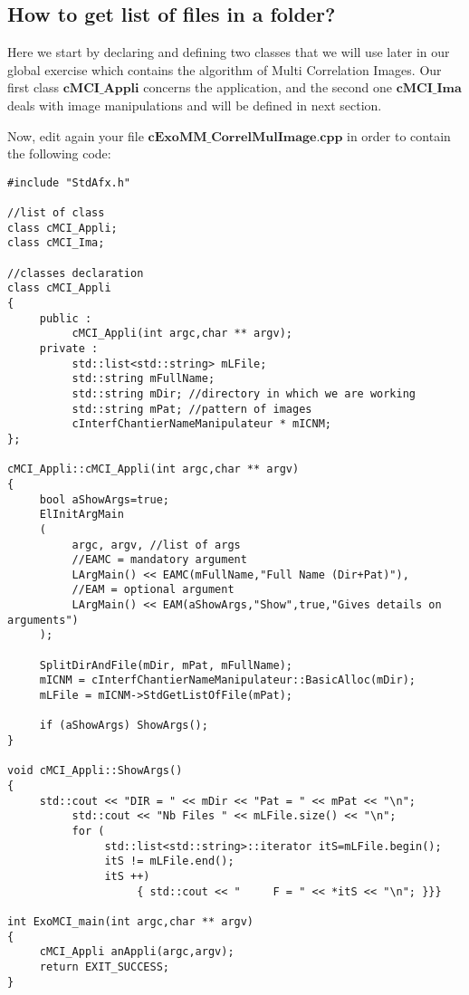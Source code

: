 \documentclass[a4paper]{book}
\begin{document}
\subsection{How to get list of files in a folder?}
Here we start by declaring and defining two classes that we will use later in our global exercise which contains the algorithm of Multi Correlation Images. Our first class $\textbf{cMCI\_Appli}$ concerns the application, and the second one $\textbf{cMCI\_Ima}$ deals with image manipulations and will be defined in next section. \newline

Now, edit again your file $\textbf{cExoMM\_CorrelMulImage.cpp}$ in order to contain the following code:

\begin{lstlisting}
#include "StdAfx.h" 

//list of class 
class cMCI_Appli; 
class cMCI_Ima; 

//classes declaration 
class cMCI_Appli 
{ 
     public : 
          cMCI_Appli(int argc,char ** argv); 
     private : 
          std::list<std::string> mLFile; 
          std::string mFullName; 
          std::string mDir; //directory in which we are working 
          std::string mPat; //pattern of images 
          cInterfChantierNameManipulateur * mICNM; 
}; 

cMCI_Appli::cMCI_Appli(int argc,char ** argv) 
{ 
     bool aShowArgs=true; 
     ElInitArgMain 
     ( 
          argc, argv, //list of args
          //EAMC = mandatory argument 
          LArgMain() << EAMC(mFullName,"Full Name (Dir+Pat)"),
          //EAM = optional argument 
          LArgMain() << EAM(aShowArgs,"Show",true,"Gives details on arguments")
     ); 

     SplitDirAndFile(mDir, mPat, mFullName); 
     mICNM = cInterfChantierNameManipulateur::BasicAlloc(mDir); 
     mLFile = mICNM->StdGetListOfFile(mPat); 

     if (aShowArgs) ShowArgs(); 
} 

void cMCI_Appli::ShowArgs() 
{ 
     std::cout << "DIR = " << mDir << "Pat = " << mPat << "\n"; 
          std::cout << "Nb Files " << mLFile.size() << "\n";     
          for ( 
               std::list<std::string>::iterator itS=mLFile.begin(); 
               itS != mLFile.end(); 
               itS ++) 
                    { std::cout << "     F = " << *itS << "\n"; }}}
                     
int ExoMCI_main(int argc,char ** argv) 
{ 
     cMCI_Appli anAppli(argc,argv); 
     return EXIT_SUCCESS;
}
\end{lstlisting}
\end{document}
